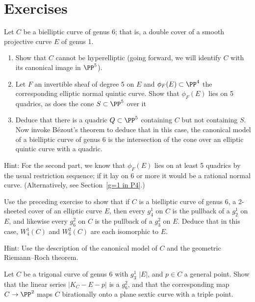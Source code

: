 {\section{Exercises}

\begin{exercise}
Let $C$ be a bielliptic curve of genus 6; that is, a double cover of a
smooth projective curve $E$ of genus 1.
\begin{enumerate}
\item Show that $C$ cannot be hyperelliptic (going forward, we will
identify $C$ with its canonical image in $\PP^5$).
\item Let $F$ an invertible sheaf of degree 5 on $E$ and $\phi_F(E)
\subset \PP^4$ the corresponding elliptic normal quintic curve. Show that
$\phi_F(E)$ lies on 5 quadrics, as does the cone $S \subset \PP^5$ over it
\item Deduce that there is a quadric $Q \subset \PP^5$ containing $C$
but not containing $S$. Now invoke B\'ezout's theorem to deduce that in
this case, the canonical model of a bielliptic curve of genus 6 is the
intersection of the cone over an elliptic quintic curve with a quadric.
\end{enumerate}

Hint: For the second part, we know that $\phi_F(E)$ lies on at least 5
quadrics by the usual restriction sequence; if it lay on 6 or more it
would be a rational normal curve. (Alternatively, see Section~\ref{g=1
in P4}.)
\end{exercise}


\begin{exercise}
Use the preceding exercise to show that if $C$ is a bielliptic curve of
genus 6, a 2-sheeted cover of an elliptic curve $E$, then every $g^1_4$
on $C$ is the pullback of a $g^1_2$ on $E$, and likewise  every $g^2_6$
on $C$ is the pullback of a $g^2_3$ on $E$. Deduce that in this case,
$W^1_4(C)$ and $W^2_6(C)$ are each isomorphic to $E$.

Hint: Use the description of the canonical model of $C$ and the geometric
Riemann--Roch theorem.
\end{exercise}


\begin{exercise}
Let $C$ be a trigonal curve of genus 6 with $g^1_3$ $|E|$, and $p \in C$
a general point. Show that the linear series $|K_C - E-p|$ is a $g^2_6$,
and that the corresponding map $C \to \PP^2$ maps $C$ birationally onto
a plane sextic curve with a triple point.
\end{exercise}


}
